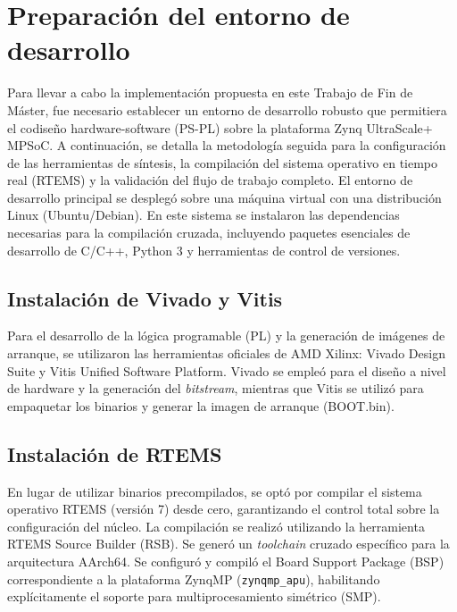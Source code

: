 
\section{Preparación del entorno de desarrollo}

Para llevar a cabo la implementación propuesta en este Trabajo de Fin de Máster, fue
necesario establecer un entorno de desarrollo robusto que permitiera el codiseño
hardware-software (PS-PL) sobre la plataforma Zynq UltraScale+ MPSoC. A continuación, se
detalla la metodología seguida para la configuración de las herramientas de síntesis, la
compilación del sistema operativo en tiempo real (RTEMS) y la validación del flujo de trabajo
completo. El entorno de desarrollo principal se desplegó sobre una máquina virtual con una
distribución Linux (Ubuntu/Debian). En este sistema se instalaron las dependencias necesarias
para la compilación cruzada, incluyendo paquetes esenciales de desarrollo de C/C++,
Python 3 y herramientas de control de versiones.

\subsection{Instalación de Vivado y Vitis}

Para el desarrollo de la lógica programable (PL) y la generación de imágenes de arranque, se
utilizaron las herramientas oficiales de AMD Xilinx: Vivado Design Suite y Vitis Unified
Software Platform. Vivado se empleó para el diseño a nivel de hardware y la generación del
\textit{bitstream}, mientras que Vitis se utilizó para empaquetar los binarios y generar la imagen de
arranque (BOOT.bin).

\subsection{Instalación de RTEMS}

En lugar de utilizar binarios precompilados, se optó por compilar el sistema operativo RTEMS
(versión 7) desde cero, garantizando el control total sobre la configuración del núcleo. La
compilación se realizó utilizando la herramienta RTEMS Source Builder (RSB). Se generó un
\textit{toolchain} cruzado específico para la arquitectura AArch64. Se configuró y compiló el Board
Support Package (BSP) correspondiente a la plataforma ZynqMP (\texttt{zynqmp\_apu}),
habilitando explícitamente el soporte para multiprocesamiento simétrico (SMP).

